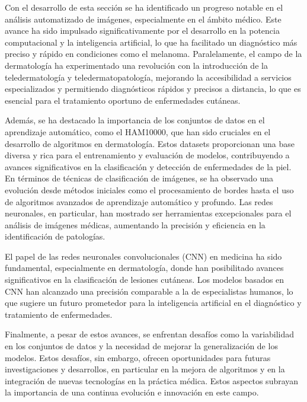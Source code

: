 Con el desarrollo de esta sección se ha identificado un progreso notable en el análisis automatizado de imágenes, especialmente en el ámbito médico. Este avance ha sido impulsado significativamente por el desarrollo en la potencia computacional y la inteligencia artificial, lo que ha facilitado un diagnóstico más preciso y rápido en condiciones como el melanoma. Paralelamente, el campo de la dermatología ha experimentado una revolución con la introducción de la teledermatología y teledermatopatología, mejorando la accesibilidad a servicios especializados y permitiendo diagnósticos rápidos y precisos a distancia, lo que es esencial para el tratamiento oportuno de enfermedades cutáneas.

Además, se ha destacado la importancia de los conjuntos de datos en el aprendizaje automático, como el HAM10000, que han sido cruciales en el desarrollo de algoritmos en dermatología. Estos datasets proporcionan una base diversa y rica para el entrenamiento y evaluación de modelos, contribuyendo a avances significativos en la clasificación y detección de enfermedades de la piel. En términos de técnicas de clasificación de imágenes, se ha observado una evolución desde métodos iniciales como el procesamiento de bordes hasta el uso de algoritmos avanzados de aprendizaje automático y profundo. Las redes neuronales, en particular, han mostrado ser herramientas excepcionales para el análisis de imágenes médicas, aumentando la precisión y eficiencia en la identificación de patologías.

El papel de las redes neuronales convolucionales (CNN) en medicina ha sido fundamental, especialmente en dermatología, donde han posibilitado avances significativos en la clasificación de lesiones cutáneas. Los modelos basados en CNN han alcanzado una precisión comparable a la de especialistas humanos, lo que sugiere un futuro prometedor para la inteligencia artificial en el diagnóstico y tratamiento de enfermedades.

Finalmente, a pesar de estos avances, se enfrentan desafíos como la variabilidad en los conjuntos de datos y la necesidad de mejorar la generalización de los modelos. Estos desafíos, sin embargo, ofrecen oportunidades para futuras investigaciones y desarrollos, en particular en la mejora de algoritmos y en la integración de nuevas tecnologías en la práctica médica. Estos aspectos subrayan la importancia de una continua evolución e innovación en este campo.
